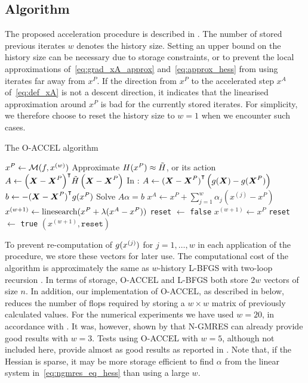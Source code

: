\documentclass[main.tex]{subfiles}
\begin{document}
\subsection{Algorithm}
The proposed acceleration procedure is
described in .  The number of stored previous
iterates $w$ denotes the history size.  Setting an upper bound on the
history size can be necessary due to storage constraints, or to
prevent the local approximations of~\eqref{eq:grad_xA_approx}
and~\eqref{eq:approx_hess} from using iterates far away from $x^P$. If
the direction from $x^P$ to the accelerated step $x^A$
of~\eqref{eq:def_xA} is not a
descent direction, it indicates that the linearised approximation
around $x^P$ is bad for the currently stored iterates.  For
simplicity, we therefore choose to reset the history size to $w=1$
when we encounter such cases.
\begin{algorithm}[htb]
  \caption{The O-ACCEL algorithm}\label{alg:ngmreso}
  \begin{algorithmic}[1]
    \State $x^P\gets \mathcal{M}(f,x^{(w)})$
    \State Approximate $H(x^P)\approx \tilde{H}$, or
    its action
    \State $A\gets
    {\left(\boldsymbol{X}-\boldsymbol{X}^P\right)}^\intercal\tilde{H}
    \left(\boldsymbol{X}-\boldsymbol{X}^P\right)$
    \hfill {\footnotesize In : $A\gets{(\boldsymbol{X}-\boldsymbol{X}^P)}^\intercal\left(
        g(\boldsymbol{X})-g(\boldsymbol{X}^P)
      \right)$}
    \State $b\gets -{(\boldsymbol{X}-\boldsymbol{X}^P)}^\intercal{g(x^P)}$
    \State Solve  $A\alpha = b$
    \State $x^A \gets x^P + \sum_{j=1}^w\alpha_j(x^{(j)}-x^P)$
    \label{algline:descent_dir}
    \State $x^{(w+1)}\gets \textnormal{linesearch}(x^P+\lambda(x^A-x^P))$\label{algli:xp_xa_ls}
    \State \texttt{reset} $\gets$ \texttt{false}
    \Else
    \State $x^{(w+1)}\gets x^P$
    \State \texttt{reset} $\gets$ \texttt{true}
    \EndIf
    \State \Return $(x^{(w+1)},\texttt{reset})$
    \EndProcedure
  \end{algorithmic}
\end{algorithm}

To prevent re-computation of $g(x^{(j)})$ for $j=1,\dots,w$ in
each application of the procedure, we store these vectors for later
use.  The computational cost of the algorithm is approximately the
same as $w$-history L-BFGS with two-loop recursion
\citep{sterck2013steepest}. %
In terms of storage, O-ACCEL and L-BFGS both store $2w$ vectors of
size $n$. In addition, our implementation of O-ACCEL, as described in
 below, reduces the number of flops required by
storing a $w\times w$ matrix of previously calculated values. For the
numerical experiments we have used $w=20$, in accordance with
\citet{sterck2013steepest}.  It was, however, shown by
\citet{sterck2013steepest} that N-GMRES can already provide good
results with $w=3$.  Tests using O-ACCEL with $w=5$, although not
included here, provide almost as good results as reported in
.  Note that, if the Hessian is sparse, it
may be more storage efficient to find $\alpha$ from the linear system
in~\eqref{eq:ngmres_eq_hess} than using a large $w$.
\end{document}
